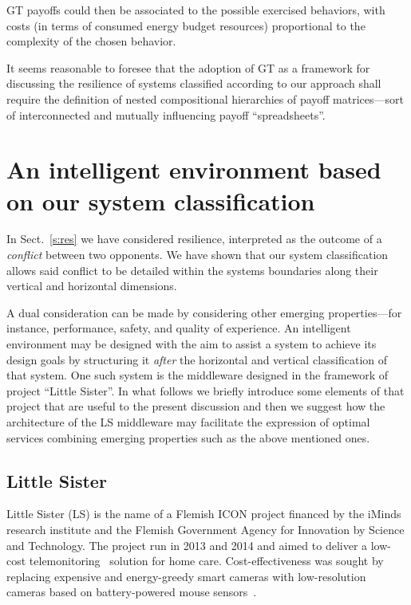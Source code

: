 \documentclass[twocolumn]{svjour3}
\begin{document}
GT payoffs could then be associated to the possible exercised behaviors, with costs (in terms
of consumed energy budget resources) proportional to the complexity of the chosen behavior.

It seems reasonable to foresee that the adoption of GT as a framework for discussing the
resilience of systems classified according to our approach
shall require the definition of nested compositional hierarchies of payoff matrices---sort
of interconnected and mutually influencing payoff ``spreadsheets''.




\section{An intelligent environment based on our system classification}\label{s:fso}
In Sect.~\ref{s:res} we have considered resilience, interpreted as the outcome of
a \emph{conflict\/} between two opponents. We have shown that our system classification
allows said conflict to be detailed within the systems boundaries along
their vertical and horizontal dimensions.

A dual consideration can be made by considering other emerging properties---for instance,
performance, safety, and quality of experience. An intelligent environment may be designed with the aim to 
assist a system to achieve its design goals by structuring it \emph{after\/} the horizontal and vertical
classification of that system. One such system is the middleware designed in the framework
of project ``Little Sister''. In what follows
we briefly introduce some elements of that project that are useful to the present discussion
and then
we suggest how the architecture of the LS middleware may facilitate the expression of
optimal services combining emerging properties such as the above mentioned ones.

\subsection{Little Sister}\label{s:LS}
Little Sister (LS) is the name of a Flemish ICON project financed by
the iMinds research institute and the Flemish Government Agency for Innovation by
Science and Technology. The project run in 2013 and 2014 and aimed to deliver a
low-cost telemonitoring~\cite{Meystre05} solution for home care.
Cost-effectiveness was sought by replacing expensive and energy-greedy smart cameras
with low-resolution cameras
based on battery-powered mouse sensors~\cite{IGO}.
\end{document}
